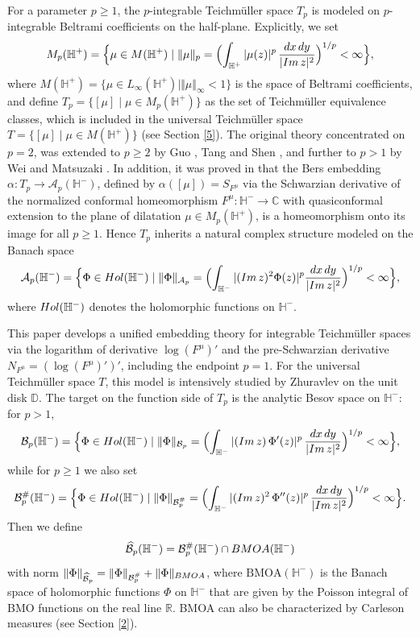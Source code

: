\documentclass[amstex,12pt,reqno]{amsart}
\theoremstyle{definition}
\begin{document}
For a parameter $p \geq 1$, the $p$-integrable Teich\-m\"ul\-ler space $T_p$ is modeled on $p$-integrable Beltrami coefficients on the half-plane. Explicitly, we set
$$
M_p(\mathbb H^+)=\Bigl\{\mu \in M(\mathbb H^+) \mid \Vert \mu \Vert_p=\Bigl(\int_{\mathbb H^+}
|\mu(z)|^p\,\frac{dx\,dy}{|{\rm Im}\, z|^2}\Bigr)^{1/p}<\infty \Bigr\},
$$
where $M(\mathbb H^+)=\{\mu \in L_\infty(\mathbb H^+) \mid \Vert \mu \Vert_\infty<1\}$ is the space of Beltrami coefficients, and define $T_p=\{[\mu] \mid \mu \in M_p(\mathbb H^+)\}$ as the set of Teichm\"uller equivalence classes,
which is included in the universal Teichm\"uller space $T=\{[\mu] \mid \mu \in M(\mathbb H^+)\}$ 
(see Section \ref{5}). The original theory concentrated on $p=2$, was extended to $p \geq 2$ by Guo \cite{Gu},
Tang and Shen \cite{TS}, and further to $p>1$ by Wei and Matsuzaki \cite{WM-3}. In addition, it was proved in \cite{WM-1,WM-4} that the Bers embedding
$\alpha:T_p \to \mathcal A_p(\mathbb H^-)$,
defined by $\alpha([\mu])=S_{F^\mu}$ via the Schwarzian derivative of the normalized conformal homeomorphism 
$F^\mu:\mathbb H^-\to\mathbb C$ with quasiconformal extension to the plane
of dilatation $\mu \in M_p(\mathbb H^+)$, is a homeomorphism onto its image for all $p\geq 1$. Hence $T_p$ inherits a natural complex structure modeled on the Banach space 
$$
\mathcal A_p(\mathbb H^-)=\Bigl\{ \Phi \in {\rm Hol}(\mathbb H^-) \mid \Vert \Phi\Vert_{{\mathcal A}_p}=\Bigl(\int_{\mathbb H^-} |({\rm Im}\,z)^2 \Phi(z)|^p \frac{dx\,dy}{|{\rm Im}\,z|^2}\Bigr)^{1/p}<\infty \Bigr\},
$$
where ${\rm Hol}(\mathbb H^-)$ denotes the holomorphic functions on $\mathbb H^-$.

This paper develops a unified embedding theory for integrable Teich\-m\"ul\-ler spaces via the logarithm of derivative $\log (F^\mu)'$ and the pre-Schwarzian derivative $N_{F^\mu}=(\log (F^\mu)')'$, including the endpoint $p=1$. 
For the universal Teichm\"uller space $T$, this model is
intensively studied by Zhuravlev \cite{Z} on the unit disk $\mathbb D$.
The target on the function side of $T_p$ is the analytic Besov space on $\mathbb H^-$:
for $p>1$,
$$
\mathcal B_p(\mathbb H^-)=\Bigl\{\Phi \in {\rm Hol}(\mathbb H^-) \mid 
\Vert\Phi\Vert_{\mathcal B_p}=\Bigl(\int_{\mathbb H^-}|({\rm Im}\, z)\,\Phi'(z)|^p\,\frac{dx\,dy}{|{\rm Im}\, z|^2}\Bigr)^{1/p}<\infty
\Bigr\},
$$
while for $p \geq 1$ we also set
$$
\mathcal B_p^{\#}(\mathbb H^-)=\Bigl\{\Phi \in {\rm Hol}(\mathbb H^-) \mid 
\Vert\Phi\Vert_{\mathcal B_p^{\#}}=\Bigl(\int_{\mathbb H^-}|({\rm Im}\, z)^2\,\Phi''(z)|^p\,\frac{dx\,dy}{|{\rm Im}\, z|^2}\Bigr)^{1/p}<\infty
\Bigr\}.
$$
Then we define
$$
\widehat{\mathcal B}_p(\mathbb H^-)=\mathcal B_p^{\#}(\mathbb H^-) \cap {\rm BMOA}(\mathbb H^-)
$$
with norm $\Vert \Phi \Vert_{\widehat{\mathcal B}_p}=\Vert \Phi \Vert_{{\mathcal B}_p^{\#}}+\Vert \Phi \Vert_{\rm BMOA}$,
where $\mathrm{BMOA}(\mathbb H^-)$ is the Banach space of holomorphic functions $\Phi$ on $\mathbb H^-$ that
are given by the Poisson integral of BMO functions on the real line $\mathbb R$.
BMOA can also be characterized by Carleson measures (see Section \ref{2}). 
\end{document}
